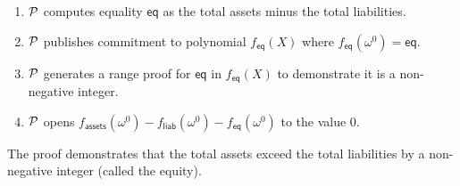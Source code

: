 

\begin{Protocol*}[t!]
\begin{mdframed}
\footnotesize


\begin{enumerate}
    \item $\mathcal{P}$ computes equality $\mathsf{eq}$ as the total assets minus the total liabilities. 
    \item $\mathcal{P}$ publishes commitment to polynomial $f_\mathsf{eq}(X)$ where $f_\mathsf{eq}(\omega^0)=\mathsf{eq}$.
    \item $\mathcal{P}$ generates a range proof for $\mathsf{eq}$ in $f_\mathsf{eq}(X)$ to demonstrate it is a non-negative integer.
    \item $\mathcal{P}$ opens $f_\mathsf{assets}(\omega^0) - f_\mathsf{liab}(\omega^0) - f_\mathsf{eq}(\omega^0)$ to the value 0.
\end{enumerate}


\normalsize	
\end{mdframed}
\caption{The \pos proof demonstrates that the total assets exceed the total liabilities by a non-negative integer (called the equity). \label{alg:pos}}
\end{Protocol*}